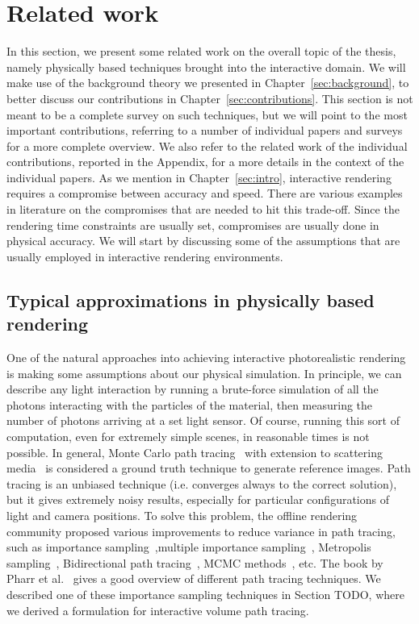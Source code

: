 \chapter{Related work}




%
\label{sec:related}
%
In this section, we present some related work on the overall topic of the thesis, namely physically based techniques brought into the interactive domain. We will make use of the background theory we presented in Chapter~\ref{sec:background}, to better discuss our contributions in Chapter~\ref{sec:contributions}. This section is not meant to be a complete survey on such techniques, but we will point to the most important contributions, referring to a number of individual papers and surveys for a more complete overview. We also refer to the related work of the individual contributions, reported in the Appendix, for a more details in the context of the individual papers. 
%
As we mention in Chapter~\ref{sec:intro}, interactive rendering requires a compromise between accuracy and speed. There are various examples in literature on the compromises that are needed to hit this trade-off. Since the rendering time constraints are usually set, compromises are usually done in physical accuracy. We will start by discussing some of the assumptions that are usually employed in interactive rendering environments. 
%
\section{Typical approximations in physically based rendering}

One of the natural approaches into achieving interactive photorealistic rendering is making some assumptions about our physical simulation. In principle, we can describe any light interaction by running a brute-force simulation of all the photons interacting with the particles of the material, then measuring the number of photons arriving at a set light sensor. Of course, running this sort of computation, even for extremely simple scenes, in reasonable times is not possible. In general, Monte Carlo path tracing~\cite{Kajiya1986} with extension to scattering media~\cite{Rushmeier1988} is considered a ground truth technique to generate reference images. Path tracing is an unbiased technique (i.e. converges always to the correct solution), but it gives extremely noisy results, especially for particular configurations of light and camera positions. To solve this problem, the offline rendering community proposed various improvements to reduce variance in path tracing, such as importance sampling~\cite{Kirk1991},multiple importance sampling~\cite{Veach1995}, Metropolis sampling~\cite{Veach1995}, Bidirectional path tracing~\cite{Veach1997}, MCMC methods~\cite{Jakob2012}, etc. The book by Pharr et al.~\cite{Pharr2017} gives a good overview of different path tracing techniques. We described one of these importance sampling techniques in Section TODO, where we derived a formulation for interactive volume path tracing.

